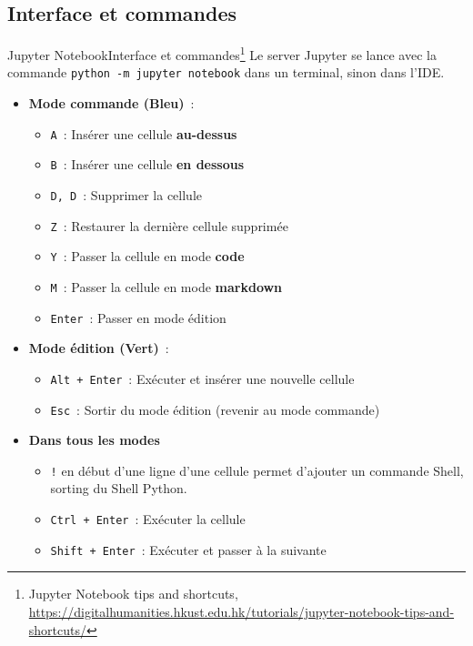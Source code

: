 \documentclass{beamer}
\begin{document}
    \subsection{Interface et commandes}
    \begin{frame}{Jupyter Notebook}{Interface et commandes\footnote{Jupyter Notebook tips and shortcuts, \url{https://digitalhumanities.hkust.edu.hk/tutorials/jupyter-notebook-tips-and-shortcuts/}}}
        \footnotesize
        Le server Jupyter se lance avec la commande \lstinline{python -m jupyter notebook} dans un terminal, sinon dans l'IDE.
        \begin{itemize}
            \footnotesize
            \item \textbf{Mode commande (Bleu)}~:
            \begin{itemize}
                \footnotesize
                \item \texttt{A}~: Insérer une cellule \textbf{au-dessus}
                \item \texttt{B}~: Insérer une cellule \textbf{en dessous}
                \item \texttt{D, D}~: Supprimer la cellule
                \item \texttt{Z}~: Restaurer la dernière cellule supprimée
                \item \texttt{Y}~: Passer la cellule en mode \textbf{code}
                \item \texttt{M}~: Passer la cellule en mode \textbf{markdown}
                \item \texttt{Enter}~: Passer en mode édition
            \end{itemize}

            \item \textbf{Mode édition (Vert)}~:
            \begin{itemize}
                \footnotesize
                \item \texttt{Alt + Enter}~: Exécuter et insérer une nouvelle cellule
                \item \texttt{Esc}~: Sortir du mode édition (revenir au mode commande)
            \end{itemize}
            \item \textbf{Dans tous les modes}
            \begin{itemize}
                \footnotesize
                \item \lstinline{!} en début d'une ligne d'une cellule permet d'ajouter un commande Shell, sorting du Shell Python.
                \item \texttt{Ctrl + Enter}~: Exécuter la cellule
                \item \texttt{Shift + Enter}~: Exécuter et passer à la suivante
            \end{itemize}
        \end{itemize}
    \end{frame}
\end{document}
